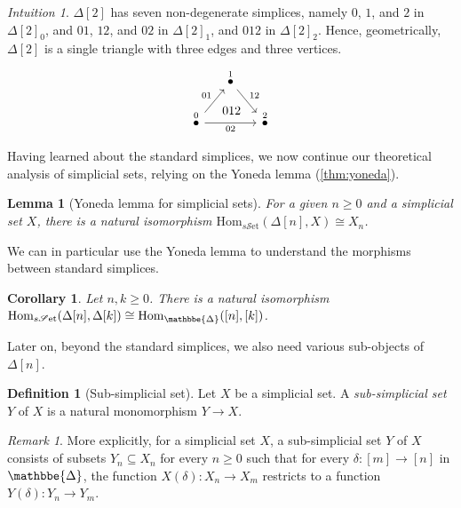 \documentclass[11pt, a4paper]{amsart}
\def\DDelta{{\mathbbe{\Delta}}}
\newcommand{\DD}{\DDelta}
\newcommand{\Hom}{\mathrm{Hom}}
\newcommand{\sSet}{s\mathscr{S}\mathrm{et}}
\newtheorem{lemma}[equation]{Lemma}
\newtheorem{corollary}[equation]{Corollary}
\theoremstyle{definition}
\newtheorem{definition}[equation]{Definition}
\theoremstyle{remark}
\newtheorem{remark}[equation]{Remark}
\newtheorem{intuition}[equation]{Intuition}
\numberwithin{equation}{section}
\begin{document}
\begin{intuition}
  $\Delta[2]$ has seven non-degenerate simplices, namely $0$, $1$, and $2$ in $\Delta[2]_0$, and $01$, $12$, and $02$ in $\Delta[2]_1$, and $012$ in $\Delta[2]_2$. Hence, geometrically, $\Delta[2]$ is a single triangle with three edges and three vertices.
  \[ 
  \begin{tikzcd}[row sep=0.5cm, column sep=0.5cm]
    & \overset{1}{\bullet} \arrow[dr, "12"] & \\
    \overset{0}{\bullet} \arrow[ur, "01"] \arrow[rr, ""{name=U, above}, "02"'] &   & \overset{2}{\bullet}
    \arrow[start anchor={[xshift=-5ex, yshift=4ex]}, to=U, phantom, "012"]
  \end{tikzcd}
  \]
\end{intuition}
     
Having learned about the standard simplices, we now continue our theoretical analysis of simplicial sets, relying on the Yoneda lemma (\cref{thm:yoneda}).

\begin{lemma}[Yoneda lemma for simplicial sets] \label{lemma:delta yoneda}
  For a given $n \geq 0$ and a simplicial set $X$, there is a natural isomorphism $\Hom_{\sSet}(\Delta[n],X) \cong X_n$.
\end{lemma}

We can in particular use the Yoneda lemma to understand the morphisms between standard simplices.

\begin{corollary}
 Let $n, k \geq 0$. There is a natural isomorphism $\Hom_{\sSet}(\Delta[n],\Delta[k]) \cong \Hom_{\DD}([n],[k])$.
\end{corollary}

Later on, beyond the standard simplices, we also need various sub-objects of $\Delta[n]$.

\begin{definition}[Sub-simplicial set] \label{def:sub simplicial set}
  Let $X$ be a simplicial set. A \emph{sub-simplicial set} $Y$ of $X$ is a natural monomorphism $Y \to X$.
\end{definition}

\begin{remark}
  More explicitly, for a simplicial set $X$, a sub-simplicial set $Y$ of $X$ consists of subsets $Y_n \subseteq X_n$ for every $n \geq 0$ such that for every $\delta\colon [m] \to [n]$ in $\DD$, the function $X(\delta)\colon X_n \to X_m$ restricts to a function $Y(\delta)\colon Y_n \to Y_m$.
\end{remark}
\end{document}
